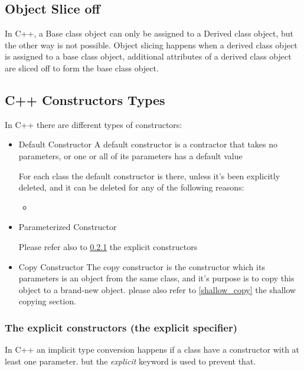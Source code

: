 \documentclass{article}
\begin{document}
\subsection{Object Slice off}
In C++, a Base class object can only be assigned to a Derived class object, but the other way is not possible.
Object slicing happens when a derived class object is assigned to a base class object, additional attributes of a derived class object are sliced off to form the base class object.



\subsection{C++ Constructors Types}
In C++ there are different types of constructors:
\begin{itemize}
  \item Default Constructor
  A default constructor is a contractor that takes no parameters, or one or all of its parameters has a default value

  For each class the default constructor is there, unless it's been explicitly deleted, and it can be deleted for any of the following reasons:
  \begin{itemize}
    \item 
  \end{itemize}

  


  \item Parameterized Constructor
  
  Please refer also to \ref{explicit_constructors} the explicit constructors

  \item Copy Constructor
  The copy constructor is the constructor which its parameters is an object from the same class, and it's purpose is to copy this object to a brand-new object. please also refer to \ref{shallow_copy} the shallow copying section.

  


\end{itemize}

\subsubsection{The explicit constructors (the explicit specifier)} \label{explicit_constructors}
In C++ an implicit type conversion happens if a class have a constructor with at least one parameter. but the \textit{explicit} keyword is used to prevent that.

\end{document}
